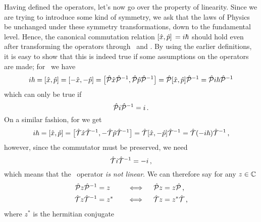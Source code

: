         Having defined the operators, let's now go over the property of linearity. Since we are trying to introduce some kind of symmetry, we ask that the laws of Physics be unchanged under these symmetry transformations, down to the fundamental level. Hence, the canonical commutation relation $\comm*{\hx}{\hp} = i \hbar$ should hold even after transforming the operators through \hP\ and \hT. By using the earlier definitions, it is easy to show that this is indeed true if some assumptions on the operators are made; for \hP\ we have
        \begin{align*}
            i \hbar 
            = \comm*{\hx}{\hp}\! 
            = \comm*{-\hx}{-\hp} \!
            = \bigl[\hP \hx \hP^{-1},\hP \hp \hP^{-1}\bigr] 
            = \hP \comm*{\hx}{\hp}\! \hP^{-1} 
            = \hP i \hbar \hP^{-1} 
        \end{align*}
        which can only be true if
        \begin{equation}
            \label{eq:PiP}
            \mathcal{\hat{P}} i \mathcal{\hat{P}}^{-1} = i
            \,\text{.}
        \end{equation}
        On a similar fashion, for \hT we get
        \begin{align*}
            i \hbar
            = \comm*{\hx}{\hp}\! 
            = \bigl[\hT \hx \hT^{-1},-\hT \hp \hT^{-1}\bigr] 
            = \hT \comm*{\hx}{-\hp}\! \hT^{-1}
            = \hT \pqty{-i \hbar} \hT^{-1}
            \mycomma
        \end{align*}
        however, since the commutator must be preserved, we need
        \begin{equation}
            \label{eq:TiT}
            \mathcal{\hat{T}} i \mathcal{\hat{T}}^{-1} = -i
            \,\text{,}
        \end{equation}
        which means that the \hT\ operator \emph{is not linear}. We can therefore say for any $z \in \mathbb{C}$ 
        \begin{alignat}{3}
            \label{eq:P-linear}
            \mathcal{\hat{P}} z \mathcal{\hat{P}}^{-1} &= z        
            &\quad\iff\quad 
            \mathcal{\hat{P}} z &= z \mathcal{\hat{P}}
            \,\text{,}
            \\
            \label{eq:T-antilinear}
            \mathcal{\hat{T}} z \mathcal{\hat{T}}^{-1} &= z^* 
            &\quad\iff\quad 
            \mathcal{\hat{T}} z &= z^* \mathcal{\hat{T}}
            \,\text{,}
        \end{alignat}
        where $z^*$ is the hermitian conjugate %
